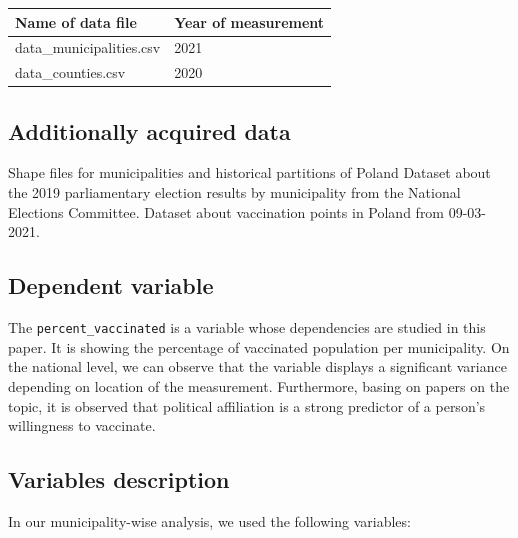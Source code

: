 \documentclass[a4paper,12pt]{article} %
\begin{document}
\begin{table}[htbp]
  \begin{tabular}{|l|l|}
    \hline
  Name of data file        & Year of measurement \\
  \hline
  data\_municipalities.csv & 2021                 \\
  data\_counties.csv       & 2020      \\        
  \hline 
  \end{tabular}
\end{table}

 
\subsection{Additionally acquired data}
Shape files for municipalities and historical partitions of Poland
Dataset about the 2019 parliamentary election results by municipality from the National Elections Committee.
Dataset about vaccination points in Poland from 09-03-2021. \cite{polonszczepien2021}

 
\subsection{Dependent variable}
The \texttt{\mbox{percent\_vaccinated}} is a variable whose dependencies are studied in this paper. It is showing the percentage of vaccinated population per municipality. On the national level, we can observe that the variable displays a significant variance depending on location of the measurement. Furthermore, basing on papers on the topic, \cite{dolman2023opposing} 
it is observed that political affiliation is a strong predictor of a person's willingness to vaccinate.
 

\subsection{Variables description}
In our municipality-wise analysis, we used the following variables:
\end{document}
